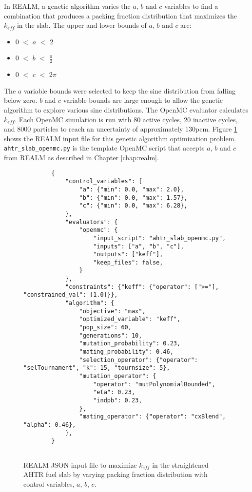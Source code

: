 In REALM, a genetic algorithm varies the $a$, $b$ and $c$ variables to find a combination 
that produces a packing fraction distribution that maximizes the $k_{eff}$ in 
the slab. 
The upper and lower bounds of $a$, $b$ and $c$ are: 
\begin{itemize}
    \item 0 $<$ $a$ $<$ 2 
    \item 0 $<$ $b$ $<$ $\frac{\pi}{2}$
    \item 0 $<$ $c$ $<$ $2\pi$
\end{itemize}
The $a$ variable bounds were selected to keep the sine distribution from falling 
below zero. $b$ and $c$ variable bounds are large enough to allow the genetic 
algorithm to explore various sine distributions. 
The OpenMC evaluator calculates $k_{eff}$. 
Each OpenMC simulation is run with 80 active cycles, 20 inactive cycles, and 
8000 particles to reach an uncertainty of approximately 130pcm. 
Figure \ref{fig:realm-input-simple} shows the REALM input file for this 
genetic algorithm optimization problem. 
\texttt{ahtr\_slab\_openmc.py} is the template OpenMC script that accepts 
$a$, $b$ and $c$ from REALM as described in Chapter \ref{chap:realm}. 
\begin{figure}[]
    \begin{verbatim}
        {
            "control_variables": {
                "a": {"min": 0.0, "max": 2.0},
                "b": {"min": 0.0, "max": 1.57},
                "c": {"min": 0.0, "max": 6.28},
            },
            "evaluators": {
                "openmc": {
                    "input_script": "ahtr_slab_openmc.py",
                    "inputs": ["a", "b", "c"],
                    "outputs": ["keff"],
                    "keep_files": false,
                }
            },
            "constraints": {"keff": {"operator": [">="], "constrained_val": [1.0]}},
            "algorithm": {
                "objective": "max",
                "optimized_variable": "keff",
                "pop_size": 60,
                "generations": 10,
                "mutation_probability": 0.23,
                "mating_probability": 0.46,
                "selection_operator": {"operator": "selTournament", "k": 15, "tournsize": 5},
                "mutation_operator": {
                    "operator": "mutPolynomialBounded",
                    "eta": 0.23,
                    "indpb": 0.23,
                },
                "mating_operator": {"operator": "cxBlend", "alpha": 0.46},
            },
        }
        
    \end{verbatim}
    \caption{\acrfull{REALM} JSON input file to maximize $k_{eff}$ in the 
    straightened \acrfull{AHTR} fuel slab by varying packing fraction distribution 
    with control variables, $a$, $b$, $c$.}
    \label{fig:realm-input-simple}
\end{figure}

